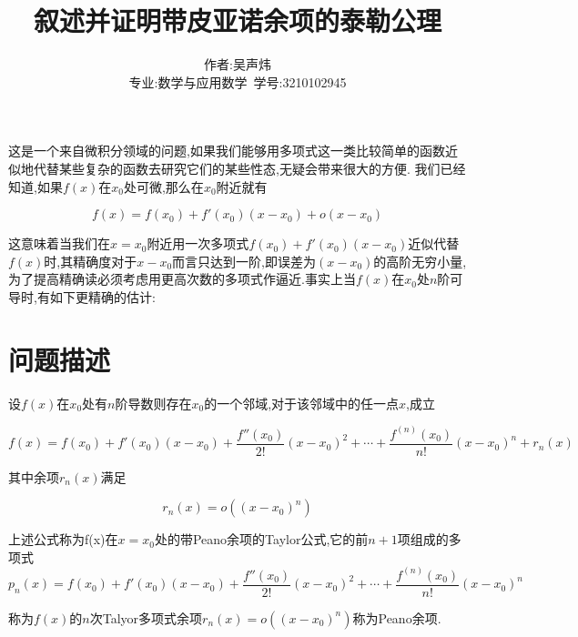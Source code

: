\documentclass{ctexart}
\title{叙述并证明带皮亚诺余项的泰勒公理}
\author{作者:吴声炜\\专业:数学与应用数学\ 学号:3210102945}
\begin{document}
\maketitle

这是一个来自微积分领域的问题,如果我们能够用多项式这一类比较简单的函数近似地代替某些复杂的函数去研究它们的某些性态,无疑会带来很大的方便.
我们已经知道,如果$f(x)$在$x_0$处可微,那么在$x_0$附近就有

\begin{equation}
  f(x)=f(x_0)+f'(x_0)(x-x_0)+o(x-x_0)\label{001}
\end{equation}

这意味着当我们在$x=x_0$附近用一次多项式$f(x_0)+f'(x_0)(x-x_0)$近似代替$f(x)$时,其精确度对于$x-x_0$而言只达到一阶,即误差为$(x-x_0)$的高阶无穷小量,为了提高精确读必须考虑用更高次数的多项式作逼近.事实上当$f(x)$在$x_0$处$n$阶可导时,有如下更精确的估计:
\section{问题描述}
设$f(x)$在$x_0$处有$n$阶导数则存在$x_0$的一个邻域,对于该邻域中的任一点$x$,成立

\begin{equation}
  f(x)=f(x_0)+f'(x_0)(x-x_0)+\frac{f''(x_0)}{2!}(x-x_0)^2+\cdots+\frac{f^{(n)}(x_0)}{n!}(x-x_0)^n+r_n(x)\label{002}
\end{equation}

其中余项$r_n(x)$满足

\begin{equation}
  r_n(x)=o((x-x_0)^n)\label{003}
\end{equation}

上述公式称为f(x)在$x=x_0$处的带Peano余项的Taylor公式,它的前$n+1$项组成的多项式
\begin{equation}
  p_n(x)=f(x_0)+f'(x_0)(x-x_0)+\frac{f''(x_0)}{2!}(x-x_0)^2+\cdots+\frac{f^{(n)}(x_0)}{n!}(x-x_0)^n\label{004}
\end{equation}

称为$f(x)$的$n$次Talyor多项式余项$r_n(x)=o((x-x_0)^n)$称为Peano余项.
\end{document}
